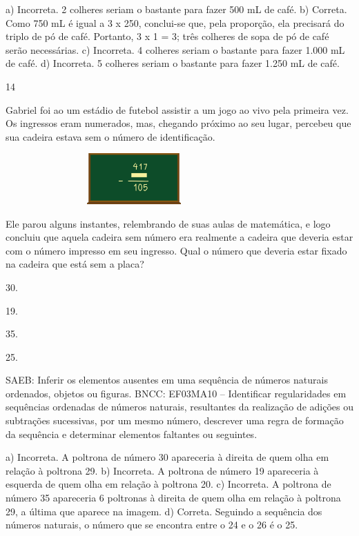 \begin{multicols}{2}
\begin{enumerate}
{a) Incorreta. 2 colheres seriam o bastante para fazer 500 mL de café.
b) Correta. Como 750 mL é igual a 3 x 250, conclui-se que, pela proporção, ela
precisará do triplo de pó de café. Portanto, 3 x 1 = 3; três colheres de sopa de pó de café serão necessárias.
c) Incorreta. 4 colheres seriam o bastante para fazer 1.000 mL de café.
d) Incorreta. 5 colheres seriam o bastante para fazer 1.250 mL de café.

\num{14}

Gabriel foi ao um estádio de futebol assistir a um jogo ao vivo pela primeira vez. Os ingressos eram numerados, mas, chegando próximo ao seu
lugar, percebeu que sua cadeira estava sem o número de identificação.


\includegraphics[width=3.87534in,height=0.76673in]{media/image122.png}

Ele parou alguns instantes, relembrando de suas aulas de matemática, e logo concluiu que aquela cadeira sem número era realmente a cadeira que deveria estar com o número impresso em seu ingresso. Qual o número que
deveria estar fixado na cadeira que está sem a placa?

\begin{escolha}
\item
  30.
\item
  19.
\item
  35.
\item
  25.
\end{escolha}

SAEB: Inferir os elementos ausentes em uma sequência de
números naturais ordenados, objetos ou figuras.
BNCC: EF03MA10 -- Identificar regularidades em sequências ordenadas de números naturais,
resultantes da realização de adições ou subtrações sucessivas, por um mesmo número,
descrever uma regra de formação da sequência e determinar elementos faltantes ou seguintes.

a) Incorreta. A poltrona de número 30 apareceria à direita de quem olha em relação à poltrona 29.
b) Incorreta. A poltrona de número 19 apareceria à esquerda de quem olha em relação à poltrona 20.
c) Incorreta. A poltrona de número 35 apareceria  6 poltronas à direita de quem olha em relação à poltrona 29, a última que aparece na imagem.
d) Correta. Seguindo a sequência dos números naturais, o número que se encontra entre o 24 e o 26 é o 25.

}
\end{enumerate}
\end{multicols}

